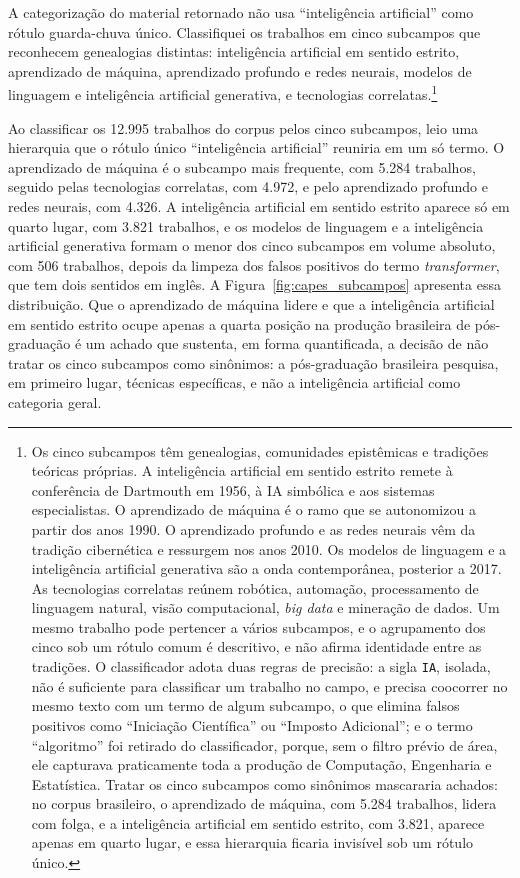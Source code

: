 A categorização do material retornado não usa \enquote{inteligência artificial} como rótulo guarda-chuva único. Classifiquei os trabalhos em cinco subcampos que reconhecem genealogias distintas: inteligência artificial em sentido estrito, aprendizado de máquina, aprendizado profundo e redes neurais, modelos de linguagem e inteligência artificial generativa, e tecnologias correlatas.\footnote{Os cinco subcampos têm genealogias, comunidades epistêmicas e tradições teóricas próprias. A inteligência artificial em sentido estrito remete à conferência de Dartmouth em 1956, à IA simbólica e aos sistemas especialistas. O aprendizado de máquina é o ramo que se autonomizou a partir dos anos 1990. O aprendizado profundo e as redes neurais vêm da tradição cibernética e ressurgem nos anos 2010. Os modelos de linguagem e a inteligência artificial generativa são a onda contemporânea, posterior a 2017. As tecnologias correlatas reúnem robótica, automação, processamento de linguagem natural, visão computacional, \emph{big data} e mineração de dados. Um mesmo trabalho pode pertencer a vários subcampos, e o agrupamento dos cinco sob um rótulo comum é descritivo, e não afirma identidade entre as tradições. O classificador adota duas regras de precisão: a sigla \texttt{IA}, isolada, não é suficiente para classificar um trabalho no campo, e precisa coocorrer no mesmo texto com um termo de algum subcampo, o que elimina falsos positivos como \enquote{Iniciação Científica} ou \enquote{Imposto Adicional}; e o termo \enquote{algoritmo} foi retirado do classificador, porque, sem o filtro prévio de área, ele capturava praticamente toda a produção de Computação, Engenharia e Estatística. Tratar os cinco subcampos como sinônimos mascararia achados: no corpus brasileiro, o aprendizado de máquina, com 5.284 trabalhos, lidera com folga, e a inteligência artificial em sentido estrito, com 3.821, aparece apenas em quarto lugar, e essa hierarquia ficaria invisível sob um rótulo único.}

Ao classificar os 12.995 trabalhos do corpus pelos cinco subcampos, leio uma hierarquia que o rótulo único \enquote{inteligência artificial} reuniria em um só termo. O aprendizado de máquina é o subcampo mais frequente, com 5.284 trabalhos, seguido pelas tecnologias correlatas, com 4.972, e pelo aprendizado profundo e redes neurais, com 4.326. A inteligência artificial em sentido estrito aparece só em quarto lugar, com 3.821 trabalhos, e os modelos de linguagem e a inteligência artificial generativa formam o menor dos cinco subcampos em volume absoluto, com 506 trabalhos, depois da limpeza dos falsos positivos do termo \emph{transformer}, que tem dois sentidos em inglês. A Figura~\ref{fig:capes_subcampos} apresenta essa distribuição. Que o aprendizado de máquina lidere e que a inteligência artificial em sentido estrito ocupe apenas a quarta posição na produção brasileira de pós-graduação é um achado que sustenta, em forma quantificada, a decisão de não tratar os cinco subcampos como sinônimos: a pós-graduação brasileira pesquisa, em primeiro lugar, técnicas específicas, e não a inteligência artificial como categoria geral.

